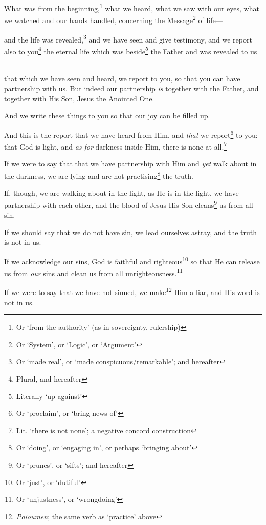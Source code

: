 \documentclass[article]{memoir}%
\newcounter{vnum}
\renewcommand*{\chapter}{
	\vspace{\baselineskip}
	\settowidth{\chapindent}{\chapnumfont 999}
	\noindent\llap{\makebox[\chapindent][l]{%
		\chapnumfont \thechapter}}%
	\addtocounter{chapter}{1}
}
\newcommand{\vnum}{%
	\textsuperscript{\thevnum}%
	\addtocounter{vnum}{1}%
}
\newcommand{\infer}[1]{\textit{#1}}
\newcommand{\focus}[1]{{#1}}
\renewcommand*{\book}[1]{%
	\makebox[\textwidth][c]{\centering \booktitlefont #1}%
}
\begin{document}
\book{1 John}
	
\chapter{} \vnum What was from the beginning,\footnote{Or ‘from the authority’ (as in sovereignty, rulership)} what we heard, what we saw with our eyes, what we watched and our hands handled, concerning the Message\footnote{Or ‘System’, or ‘Logic’, or ‘Argument’} of life---\vnum and the life was revealed,\footnote{Or `made real', or `made conspicuous/remarkable'; and hereafter} and we have seen and give testimony, and we report also to you\footnote{Plural, and hereafter} the eternal life which was beside\footnote{Literally ‘up against’} the Father and was revealed to us---\vnum that which we have seen and heard, we report to you, so that you can have partnership with us. But indeed our partnership \infer{is} together with the Father, and together with His Son, Jesus the Anointed One. \vnum And we write these things to you so that our joy can be filled up.

\vnum And \focus{this} is the report that we have heard from Him, and \infer{that} we report\footnote{Or `proclaim', or `bring news of'} to you: that God is light, and \infer{as for} darkness inside Him, there is none at all.\footnote{Lit. `there is not none'; a negative concord construction} \vnum If we were to say that that we have partnership with Him and \infer{yet} walk about in the darkness, we are lying and are not practising\footnote{Or `doing', or `engaging in', or perhaps `bringing about'} the truth. \vnum If, though, we are walking about in the light, as He is in the light, we have partnership with each other, and the blood of Jesus His Son cleans\footnote{Or `prunes', or `sifts'; and hereafter} us from all sin. \vnum If we should say that we do not have sin, we lead ourselves astray, and the truth is not in us. \vnum If we acknowledge our sins, God is faithful and righteous\footnote{Or `just', or `dutiful'} so that He can release us from \infer{our} sins and clean us from all unrighteousness.\footnote{Or `unjustness', or `wrongdoing'} \vnum If we were to say that we have not sinned, we make\footnote{\textit{Poioumen}; the same verb as `practice' above} Him a liar, and His word is not in us.
\end{document}
